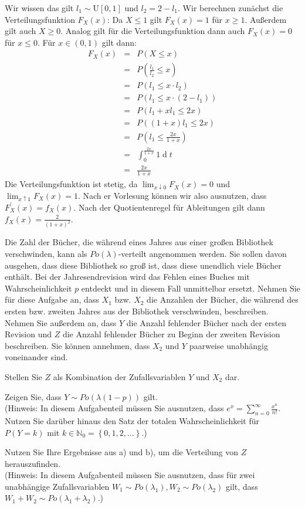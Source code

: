 \begin{Answer}
Wir wissen das gilt $l_1\sim \text{U}\left[0,1\right]$ und $l_2=2-l_1$. Wir berechnen zunächst die Verteilungsfunktion $F_X(x)$:
Da $X\leq 1$ gilt $F_X(x)=1$ für $x\geq1$. Außerdem gilt auch $X\geq 0$. Analog gilt für die Verteilungsfunktion dann auch $F_X(x)=0$ für $x\leq0$. Für $x\in\left(0,1\right)$ gilt dann:
\begin{eqnarray*}
	F_X(x)&=&P(X\leq x)\\
	&=&P(\frac{l_1}{l_2}\leq x)\\
	&=&P(l_1\leq x\cdot l_2)\\
	&=&P(l_1\leq x\cdot (2-l_1))\\
	&=&P(l_1+xl_1\leq 2x)\\
	&=&P((1+x)l_1\leq 2x)\\
	&=&P(l_1\leq \frac{2x}{1+x})\\
	&=&\int_0^{\frac{2x}{1+x}}1\operatorname{d}t\\
	&=&\frac{2x}{1+x}
\end{eqnarray*}
Die Verteilungsfunktion ist stetig, da $\lim_{x\downarrow0}F_X(x)=0$ und $\lim_{x\uparrow1}F_X(x)=1$. Nach er Vorlesung können wir also ausnutzen, dass $F^{'}_X(x)=f_X(x)$. Nach der Quotientenregel für Ableitungen gilt dann $f_X(x)=\frac{2}{(1+x)^2}$.
\end{Answer}


\begin{Exercise}
	Die Zahl der Bücher, die während eines Jahres aus einer großen Bibliothek verschwinden, kann als $Po(\lambda)$-verteilt angenommen werden. Sie sollen davon ausgehen, dass diese Bibliothek so groß ist, dass diese unendlich viele Bücher enthält. Bei der Jahresendrevision wird das Fehlen eines Buches mit Wahrscheinlichkeit $p$ entdeckt und in diesem Fall unmittelbar ersetzt. Nehmen Sie für diese Aufgabe an, dass $X_1$ bzw. $X_2$ die Anzahlen der Bücher, die während des ersten bzw. zweiten Jahres aus der Bibliothek verschwinden, beschreiben. Nehmen Sie außerdem an, dass $Y$ die Anzahl fehlender Bücher nach der ersten Revision und $Z$ die Anzahl fehlender Bücher zu Beginn der zweiten Revision beschreiben. Sie können annehmen, dass $X_2$ und $Y$ paarweise unabhängig voneinander sind.
	
	\Question Stellen Sie $Z$ als Kombination der Zufallsvariablen $Y$ und $X_2$ dar.
	
	\Question Zeigen Sie, dass $Y\sim Po(\lambda(1-p))$ gilt.\\
	(Hinweis: In diesem Aufgabenteil müssen Sie ausnutzen, dass $e^x=\sum_{n=0}^\infty \frac{x^n}{n!}$. Nutzen Sie darüber hinaus den Satz der totalen Wahrscheinlichkeit für $P(Y=k)$ mit $k\in\mathbb{N}_0=\left\lbrace0,1,2,\dots\right\rbrace$.)
	
	\Question Nutzen Sie Ihre Ergebnisse aus a) und b), um die Verteilung von $Z$ herauszufinden.\\
	(Hinweis: In diesem Aufgabenteil müssen Sie ausnutzen, dass für zwei unabhängige Zufallsvariablen $W_1\sim Po(\lambda_1),W_2\sim Po(\lambda_2)$ gilt, dass $W_1+W_2\sim Po(\lambda_1+\lambda_2)$.)
\end{Exercise}

